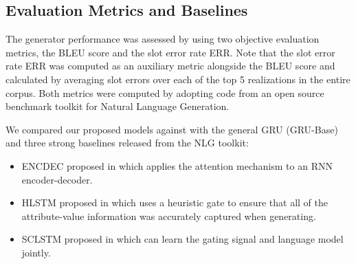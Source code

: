 \documentclass{llncs}
\begin{document}
\subsection{Evaluation Metrics and Baselines}\label{subsec:evaluation-metrics}
The generator performance was assessed by using two objective evaluation metrics, the BLEU score and the slot error rate ERR. Note that the slot error rate ERR was computed as an auxiliary metric alongside the BLEU score and calculated by averaging slot errors over each of the top 5 realizations in the entire corpus. Both metrics were computed by adopting code from an open source benchmark toolkit for Natural Language Generation\footnotemark[\value{footnote}].

We compared our proposed models against with the general GRU (GRU-Base) and three strong baselines released from the NLG toolkit:
\begin{itemize}
	\item ENCDEC proposed in \cite{wentoward} which applies the attention mechanism to an RNN encoder-decoder.
    \item HLSTM proposed in \cite{thwsjy15} which uses a heuristic gate to ensure that all of the attribute-value information was accurately captured when generating.
	\item SCLSTM proposed in \cite{wensclstm15} which can learn the gating signal and language model jointly.
\end{itemize} 
\end{document}
